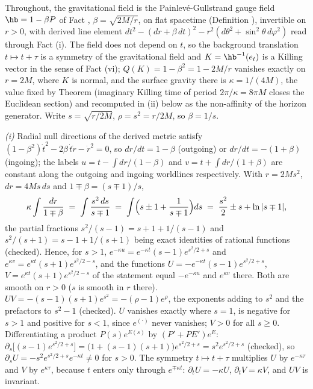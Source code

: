 Throughout, the gravitational field is the Painlev\'e-Gullstrand gauge field $\hb = 1 - \beta P$ of Fact , $\beta = \sqrt{2M/r}$, on flat spacetime (Definition ), invertible on $r > 0$, with derived line element $dt^{2} - (dr + \beta\,dt)^{2} - r^{2}(d\theta^{2} + \sin^{2}\theta\,d\varphi^{2})$ read through Fact (i). The field does not depend on $t$, so the background translation $t \mapsto t + \tau$ is a symmetry of the gravitational field and $K = \hb^{-1}(e_{t})$ is a Killing vector in the sense of Fact (vi); $Q(K) = 1 - \beta^{2} = 1 - 2M/r$ vanishes exactly on $r = 2M$, where $K$ is normal, and the surface gravity there is $\kappa = 1/(4M)$, the value fixed by Theorem  (imaginary Killing time of period $2\pi/\kappa = 8\pi M$ closes the Euclidean section) and recomputed in (ii) below as the non-affinity of the horizon generator. Write $s = \sqrt{r/2M}$, $\rho = s^{2} = r/2M$, so $\beta = 1/s$.

\emph{(i)} Radial null directions of the derived metric satisfy $(1 - \beta^{2})\dot t^{2} - 2\beta\,\dot t\dot r - \dot r^{2} = 0$, so $dr/dt = 1 - \beta$ (outgoing) or $dr/dt = -(1 + \beta)$ (ingoing); the labels $u = t - \int dr/(1 - \beta)$ and $v = t + \int dr/(1 + \beta)$ are constant along the outgoing and ingoing worldlines respectively. With $r = 2Ms^{2}$, $dr = 4Ms\,ds$ and $1 \mp \beta = (s \mp 1)/s$,
\[
\kappa\int\frac{dr}{1 \mp \beta} \;=\; \int\frac{s^{2}\,ds}{s \mp 1} \;=\; \int\Bigl(s \pm 1 + \frac{1}{s \mp 1}\Bigr)ds \;=\; \frac{s^{2}}{2} \pm s + \ln|s \mp 1| ,
\]
the partial fractions $s^{2}/(s - 1) = s + 1 + 1/(s - 1)$ and $s^{2}/(s + 1) = s - 1 + 1/(s + 1)$ being exact identities of rational functions (checked). Hence, for $s > 1$, $e^{-\kappa u} = e^{-\kappa t}(s - 1)e^{s^{2}/2 + s}$ and $e^{\kappa v} = e^{\kappa t}(s + 1)e^{s^{2}/2 - s}$, and the functions $U = -e^{-\kappa t}(s - 1)e^{s^{2}/2 + s}$, $V = e^{\kappa t}(s + 1)e^{s^{2}/2 - s}$ of the statement equal $-e^{-\kappa u}$ and $e^{\kappa v}$ there. Both are smooth on $r > 0$ ($s$ is smooth in $r$ there). $UV = -(s - 1)(s + 1)e^{s^{2}} = -(\rho - 1)e^{\rho}$, the exponents adding to $s^{2}$ and the prefactors to $s^{2} - 1$ (checked). $U$ vanishes exactly where $s = 1$, is negative for $s > 1$ and positive for $s < 1$, since $e^{(\cdot)}$ never vanishes; $V > 0$ for all $s \ge 0$. Differentiating a product $P(s)e^{E(s)}$ by $(P' + PE')e^{E}$: $\partial_{s}\bigl[(s - 1)e^{s^{2}/2 + s}\bigr] = \bigl(1 + (s - 1)(s + 1)\bigr)e^{s^{2}/2 + s} = s^{2}e^{s^{2}/2 + s}$ (checked), so $\partial_{s}U = -s^{2}e^{s^{2}/2 + s}e^{-\kappa t} \ne 0$ for $s > 0$. The symmetry $t \mapsto t + \tau$ multiplies $U$ by $e^{-\kappa\tau}$ and $V$ by $e^{\kappa\tau}$, because $t$ enters only through $e^{\mp\kappa t}$: $\partial_{t}U = -\kappa U$, $\partial_{t}V = \kappa V$, and $UV$ is invariant.

